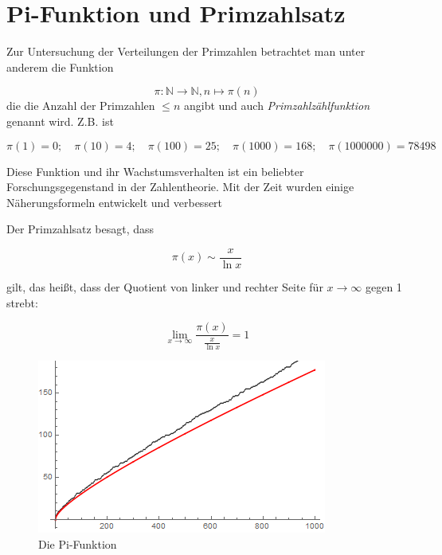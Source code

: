 \chapter{Pi-Funktion und Primzahlsatz}

Zur Untersuchung der Verteilungen der Primzahlen betrachtet man unter anderem die Funktion

\begin{equation*}
    \pi:\mathbb{N} \rightarrow \mathbb{N}, n \mapsto \pi(n)
\end{equation*}
die die Anzahl der Primzahlen $\leq n$ angibt und auch \emph{Primzahlzählfunktion} genannt wird.
Z.B. ist 

\begin{equation*}
    \pi(1)=0;\quad \pi(10)=4;\quad \pi(100)=25; \quad \pi(1000)=168;\quad \pi(1000000)=78498
\end{equation*}

Diese Funktion und ihr Wachstumsverhalten ist ein beliebter Forschungsgegenstand in der Zahlentheorie.
Mit der Zeit wurden einige Näherungsformeln entwickelt und verbessert \cite{MopOverview}

Der Primzahlsatz besagt, dass

\begin{equation*}
    \pi(x)\sim\frac x {\ln x}
\end{equation*}

gilt, das heißt, dass der Quotient von linker und rechter Seite für $x \rightarrow \infty$ gegen 1 strebt:

\begin{equation*}
    \lim_{x \rightarrow \infty}\frac{\pi(x)}{\frac{x}{\ln x}}=1
\end{equation*}


\begin{figure}[h]
    \centering
    \includegraphics[width=0.5\linewidth]{pi-func.png}
    \caption{Die Pi-Funktion}
    \label{fig:pi-function}
\end{figure}



